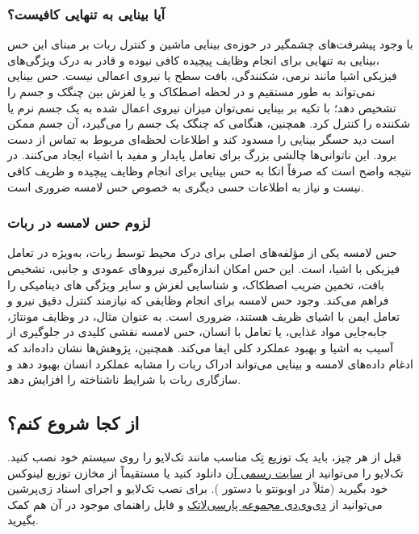 \subsubsection{آیا بینایی به تنهایی کافیست؟}

با وجود پیشرفت‌های چشمگیر در حوزه‌ی بینایی ماشین
و کنترل ربات بر مبنای این حس
،بینایی به تنهایی برای انجام وظایف پیچیده کافی نیوده و قادر به درک ویژگی‌های فیزیکی اشیا مانند نرمی، شکنندگی، بافت سطح یا نیروی اعمالی نیست. حس بینایی نمی‌تواند به طور مستقیم و در لحظه اصطکاک و یا لغزش بین چنگک و جسم را تشخیص دهد؛ با تکیه بر بینایی نمی‌توان میزان نیروی اعمال شده به یک جسم نرم یا شکننده را کنترل کرد.
\cite{yamaguchi2019recent,chi2018recent}
همچنین، هنگامی که چنگک
 یک جسم را می‌گیرد، آن جسم ممکن است دید حسگر بینایی را مسدود کند و اطلاعات لحظه‌ای مربوط به تماس از دست برود. این ناتوانی‌ها چالشی بزرگ برای تعامل پایدار و مفید با اشیاء ایجاد می‌کنند. در نتیجه واضح است که صرفاً اتکا به حس بینایی برای انجام وظایف پیچیده و ظریف کافی نیست و نیاز به اطلاعات حسی دیگری به‌ خصوص حس لامسه ضروری است.
\subsubsection{لزوم حس لامسه در ربات}
حس لامسه یکی از مؤلفه‌های اصلی برای درک محیط توسط ربات، به‌ویژه در تعامل فیزیکی با اشیا، است. این حس امکان اندازه‌گیری نیروهای عمودی و جانبی، تشخیص بافت، تخمین ضریب اصطکاک، و شناسایی لغزش و سایر ویژگی های دینامیکی را فراهم می‌کند. 
\cite{zou2017novel, yousef2011tactile}
وجود حس لامسه برای انجام وظایفی که نیازمند کنترل دقیق نیرو و تعامل ایمن با اشیای ظریف هستند، ضروری است. به عنوان مثال، در وظایف مونتاژ، جابه‌جایی مواد غذایی، یا تعامل با انسان، حس لامسه نقشی کلیدی در جلوگیری از آسیب به اشیا و بهبود عملکرد کلی ایفا می‌کند.
همچنین، پژوهش‌ها نشان داده‌اند که ادغام داده‌های لامسه و بینایی می‌تواند ادراک ربات را مشابه عملکرد انسان بهبود دهد و سازگاری ربات با شرایط ناشناخته را افزایش دهد.
\cite{dahiya2013robotic}

\subsection{از کجا شروع کنم؟}
قبل از هر چیز، باید یک توزیع تِک مناسب مانند تک‌لایو
را روی سیستم خود نصب کنید. تک‌لایو  را می‌توانید از 
 \href{http://www.tug.org/texlive}{سایت رسمی آن}%
 دانلود کنید یا مستقیماً از مخازن توزیع لینوکس خود بگیرید (مثلاً در اوبونتو با دستور
).
برای نصب تک‌لایو و اجرای اسناد زی‌پرشین می‌توانید از
\href{http://parsilatex.com/site/shop/}{دی‌وی‌دی مجموعه پارسی‌لاتک}%
و فایل راهنمای موجود در آن هم کمک بگیرید.

